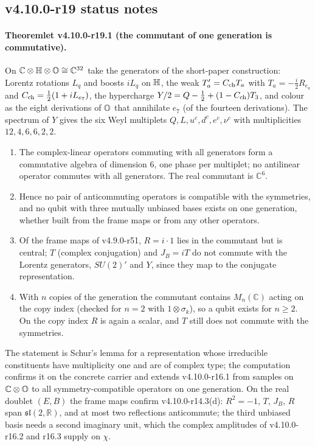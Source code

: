\subsection*{v4.10.0-r19 status notes}
\label{subsec:v4100-r19-status}

\paragraph{Theoremlet v4.10.0-r19.1 (the commutant of one generation is commutative).}
On \(\mathbb C\otimes\mathbb{H}\otimes\mathbb{O}\cong\mathbb C^{32}\) take the generators of the short-paper construction: Lorentz rotations
\(L_q\) and boosts \(iL_q\) on \(\mathbb{H}\), the weak \(T_a'=C_{\rm ch}T_a\) with \(T_a=-\tfrac i2R_{e_a}\) and \(C_{\rm ch}=\tfrac12(1+iL_{e_7})\),
the hypercharge \(Y/2=Q-\tfrac12+(1-C_{\rm ch})T_3\), and colour as the eight derivations of \(\mathbb{O}\) that annihilate \(e_7\) (of the
fourteen derivations).  The spectrum of \(Y\) gives the six Weyl multiplets \(Q,L,u^c,d^c,e^c,\nu^c\) with multiplicities
\(12,4,6,6,2,2\).
\begin{enumerate}[leftmargin=2em]
\item[(a)] The complex-linear operators commuting with all generators form a commutative algebra of dimension \(6\), one phase per
multiplet; no antilinear operator commutes with all generators.  The real commutant is \(\mathbb C^6\).
\item[(b)] Hence no pair of anticommuting operators is compatible with the symmetries, and no qubit with three mutually unbiased
bases exists on one generation, whether built from the frame maps or from any other operators.
\item[(c)] Of the frame maps of v4.9.0-r51, \(R=i\cdot1\) lies in the commutant but is central; \(T\) (complex conjugation) and
\(J_B=iT\) do not commute with the Lorentz generators, \(SU(2)'\) and \(Y\), since they map to the conjugate representation.
\item[(d)] With \(n\) copies of the generation the commutant contains \(M_n(\mathbb C)\) acting on the copy index (checked for
\(n=2\) with \(1\otimes\sigma_k\)), so a qubit exists for \(n\ge2\).  On the copy index \(R\) is again a scalar, and \(T\) still does not
commute with the symmetries.
\end{enumerate}
The statement is Schur's lemma for a representation whose irreducible constituents have multiplicity one and are of complex
type; the computation confirms it on the concrete carrier and extends v4.10.0-r16.1 from samples on \(\mathbb C\otimes\mathbb{O}\) to all
symmetry-compatible operators on one generation.  On the real doublet \((E,B)\) the frame maps confirm v4.10.0-r14.3(d): \(R^2=-1\),
\(T\), \(J_B\), \(R\) span \(\mathfrak{sl}(2,\mathbb R)\), and at most two reflections anticommute; the third unbiased basis needs a
second imaginary unit, which the complex amplitudes of v4.10.0-r16.2 and r16.3 supply on \(\chi\).

